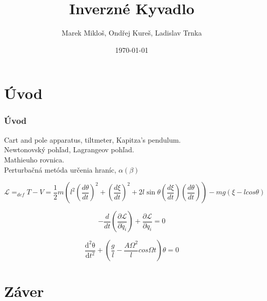 \documentclass{beamer}
\title[Mechanika]{Inverzné Kyvadlo}
\author[Skupina Z] {Marek Mikloš, Ondřej Kureš, Ladislav Trnka \\ }
\institute[Charles University]{Charles University, Czech Republic}
\date{\today}
\begin{document}
\begin{frame}
\titlepage

\end{frame}


\section*{Úvod}
\label{sec: Int}


\begin{frame}
 
 \frametitle{Úvod}
 \begin{center}
 Cart and pole apparatus, tiltmeter, Kapitza's pendulum.\\    
 Newtonovský pohľad, Lagrangeov pohľad.\\
 Mathieuho rovnica.\\
 Perturbačná metóda určenia hraníc, $\alpha(\beta)$ \\
 \end{center}

 \begin{equation*}
\mathcal{L}=_{def}T-V=\frac{1}{2}m(l^2(\frac{d\theta}{dt})^2+(\frac{d\xi}{dt})^2+2l\sin\theta(\frac{d\xi}{dt})(\frac{d\theta}{dt}))-mg(\xi-lcos{\theta})
 \end{equation*}

 \begin{equation*}
 -\frac{d}{dt}(\frac{\partial\mathcal{L}}{\partial\dot{q_{i}}})+ \frac{\partial\mathcal{L}}{\partial{}q_{i}}=0
 \end{equation*}
 
 \begin{equation*}
 \frac{\mathrm{d^2\theta} }{\mathrm{d} t^2}+(\frac{g}{l}-\frac{A{\Omega}^2}{l}cos{\Omega t})\theta=0
 \end{equation*}
 
\end{frame}
 

\section*{Záver}
\label{sec:Záver}
\end{document}

